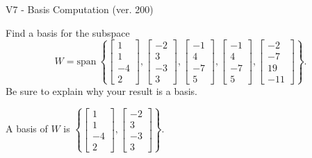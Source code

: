 \begin{exercise}
  \begin{exerciseTitle}V7 - Basis Computation (ver. 200)\end{exerciseTitle}
  \begin{exerciseStatement}
    Find a basis for the subspace 
\[W=\mathrm{span}\ \left\{\left[\begin{array}{r}
1 \\
1 \\
-4 \\
2
\end{array}\right] , \left[\begin{array}{r}
-2 \\
3 \\
-3 \\
3
\end{array}\right] , \left[\begin{array}{r}
-1 \\
4 \\
-7 \\
5
\end{array}\right] , \left[\begin{array}{r}
-1 \\
4 \\
-7 \\
5
\end{array}\right] , \left[\begin{array}{r}
-2 \\
-7 \\
19 \\
-11
\end{array}\right]\right\}.\]
 Be sure to explain why your result is a basis.


  \end{exerciseStatement}
  \begin{exerciseAnswer}
   A basis of \(W\) is  \(\left\{\left[\begin{array}{r}
1 \\
1 \\
-4 \\
2
\end{array}\right] , \left[\begin{array}{r}
-2 \\
3 \\
-3 \\
3
\end{array}\right]\right\}\).
  


  \end{exerciseAnswer}
\end{exercise}